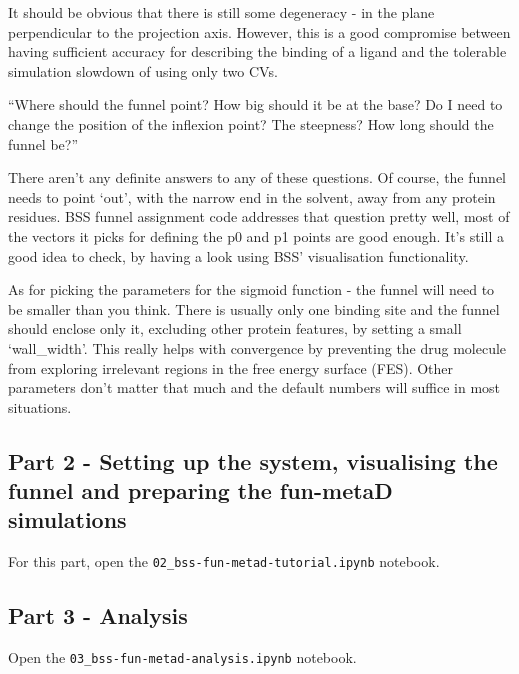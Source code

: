 It should be obvious that there is still some degeneracy - in the plane
perpendicular to the projection axis. However, this is a good compromise
between having sufficient accuracy for describing the binding of a
ligand and the tolerable simulation slowdown of using only two CVs.

``Where should the funnel point? How big should it be at the base? Do I
need to change the position of the inflexion point? The steepness? How
long should the funnel be?''

There aren't any definite answers to any of these questions. Of course,
the funnel needs to point `out', with the narrow end in the solvent,
away from any protein residues. BSS funnel assignment code addresses
that question pretty well, most of the vectors it picks for defining the
p0 and p1 points are good enough. It's still a good idea to check, by
having a look using BSS' visualisation functionality.

As for picking the parameters for the sigmoid function - the funnel will
need to be smaller than you think. There is usually only one binding
site and the funnel should enclose only it, excluding other protein
features, by setting a small `wall\_width'. This really helps with
convergence by preventing the drug molecule from exploring irrelevant
regions in the free energy surface (FES). Other parameters don't matter
that much and the default numbers will suffice in most situations.

\hypertarget{part-2---setting-up-the-system-visualising-the-funnel-and-preparing-the-fun-metad-simulations}{%
\subsection{Part 2 - Setting up the system, visualising the funnel and
preparing the fun-metaD
simulations}\label{part-2---setting-up-the-system-visualising-the-funnel-and-preparing-the-fun-metad-simulations}}

For this part, open the \texttt{02\_bss-fun-metad-tutorial.ipynb}
notebook.

\hypertarget{part-3---analysis}{%
\subsection{Part 3 - Analysis}\label{part-3---analysis}}

Open the \texttt{03\_bss-fun-metad-analysis.ipynb} notebook.
